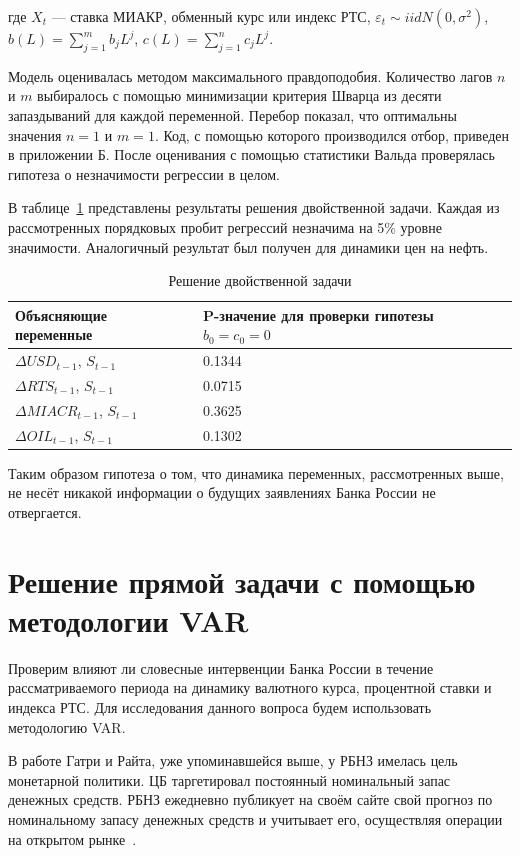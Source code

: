 \documentclass[14pt,a4paper, oneside]{extreport}
\def \Dt{\Delta}
\theoremstyle{plain}              %
\theoremstyle{definition}         %
\begin{document}
где $X_{t}$ --- ставка МИАКР, обменный курс или индекс РТС, $\varepsilon_t \sim iid N (0, \sigma^2)$, $b(L) = \sum_{j=1}^m b_j L^j$, $c(L) = \sum_{j=1}^n c_j L^j$.

Модель оценивалась методом максимального правдоподобия. Количество лагов $n$ и $m$ выбиралось с помощью минимизации критерия Шварца из десяти запаздываний для каждой переменной. Перебор показал, что оптимальны значения $n=1$ и $m=1$. Код, с помощью которого производился отбор, приведен в приложении Б. После оценивания с помощью статистики Вальда проверялась гипотеза о незначимости регрессии в целом.

В таблице~\ref{stask} представлены результаты решения двойственной задачи. Каждая из рассмотренных порядковых пробит регрессий незначима на 5\% уровне значимости. Аналогичный результат был получен для динамики цен на нефть. 

\begin{table}[H]
	\begin{center}
		\caption{Решение двойственной задачи}\label{stask}
		\begin{tabular}{|m{6cm}|m{4cm}|}
\hline
Объясняющие переменные & P-значение для проверки гипотезы $b_0 = c_0 =0$  \\ \hline
$\Dt USD_{t-1}$, $S_{t-1}$ & 0.1344   \\ \hline
$\Dt RTS_{t-1}$, $S_{t-1}$ & 0.0715   \\ \hline
$\Dt MIACR_{t-1}$, $S_{t-1}$ & 0.3625   \\ \hline
$\Dt OIL_{t-1}$, $S_{t-1}$ & 0.1302   \\ \hline
		\end{tabular}
	\end{center}
\end{table}

Таким образом гипотеза о том, что динамика переменных, рассмотренных выше, не несёт никакой информации о будущих заявлениях Банка России не отвергается.


\section{Решение прямой задачи с помощью методологии VAR}

Проверим влияют ли словесные интервенции Банка России в течение рассматриваемого периода на динамику валютного курса, процентной ставки и индекса РТС. Для исследования данного вопроса будем использовать методологию VAR.

В работе Гатри и Райта, уже упоминавшейся выше, у РБНЗ имелась цель монетарной политики. ЦБ таргетировал постоянный номинальный запас денежных средств. РБНЗ ежедневно публикует на своём сайте свой прогноз по номинальному запасу денежных средств и учитывает его, осуществляя операции на открытом рынке~\cite{guthrie2000open}. 
\end{document}
